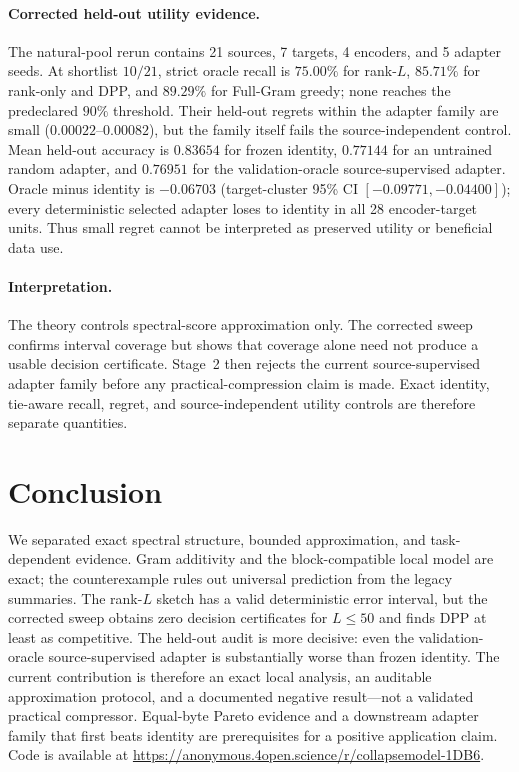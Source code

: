 \documentclass{article}
\begin{document}
\paragraph{Corrected held-out utility evidence.}
The natural-pool rerun contains 21 sources, 7 targets, 4 encoders, and 5
adapter seeds.  At shortlist $10/21$, strict oracle recall is $75.00\%$ for
rank-$L$, $85.71\%$ for rank-only and DPP, and $89.29\%$ for Full-Gram greedy;
none reaches the predeclared $90\%$ threshold.  Their held-out regrets within
the adapter family are small ($0.00022$--$0.00082$), but the family itself
fails the source-independent control.  Mean held-out accuracy is $0.83654$ for
frozen identity, $0.77144$ for an untrained random adapter, and $0.76951$ for
the validation-oracle source-supervised adapter.  Oracle minus identity is
$-0.06703$ (target-cluster 95\% CI $[-0.09771,-0.04400]$); every deterministic
selected adapter loses to identity in all 28 encoder-target units.  Thus small
regret cannot be interpreted as preserved utility or beneficial data use.

\paragraph{Interpretation.}
The theory controls spectral-score approximation only.  The corrected sweep
confirms interval coverage but shows that coverage alone need not produce a
usable decision certificate.  Stage~2 then rejects the current
source-supervised adapter family before any practical-compression claim is
made.  Exact identity, tie-aware recall, regret, and source-independent utility
controls are therefore separate quantities.

\section{Conclusion}
\label{sec:conclusion}

We separated exact spectral structure, bounded approximation, and
task-dependent evidence.  Gram additivity and the block-compatible local model
are exact; the counterexample rules out universal prediction from the legacy
summaries.  The rank-$L$ sketch has a valid deterministic error interval, but
the corrected sweep obtains zero decision certificates for $L\leq50$ and finds
DPP at least as competitive.  The held-out audit is more decisive: even the
validation-oracle source-supervised adapter is substantially worse than frozen
identity.  The current contribution is therefore an exact local analysis, an
auditable approximation protocol, and a documented negative result---not a
validated practical compressor.  Equal-byte Pareto evidence and a downstream
adapter family that first beats identity are prerequisites for a positive
application claim.
Code is available at \url{https://anonymous.4open.science/r/collapsemodel-1DB6}.
\end{document}
